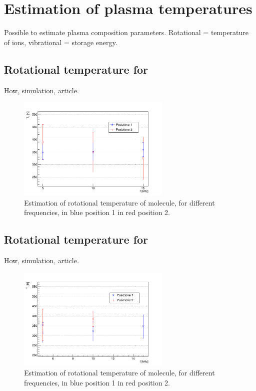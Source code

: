 \section{Estimation of plasma temperatures}
Possible to estimate plasma composition parameters. Rotational = temperature of ions, vibrational = storage energy. 
\subsection{Rotational temperature for }
How, simulation, article.
\begin{figure}
\centering
\includegraphics[width=0.65\textwidth]{Images/Spectroscopy/TrOH.png}
 \caption{Estimation of rotational temperature of  molecule, for different frequencies, in blue position 1 in red position 2.}
 \label{fig:TrOH}
\end{figure}

\subsection{Rotational temperature for }
How, simulation, article.
\begin{figure}
\centering
\includegraphics[width=0.65\textwidth]{Images/Spectroscopy/TrN2.png}
 \caption{Estimation of rotational temperature of  molecule, for different frequencies, in blue position 1 in red position 2.}
 \label{fig:TrN2}
\end{figure}


